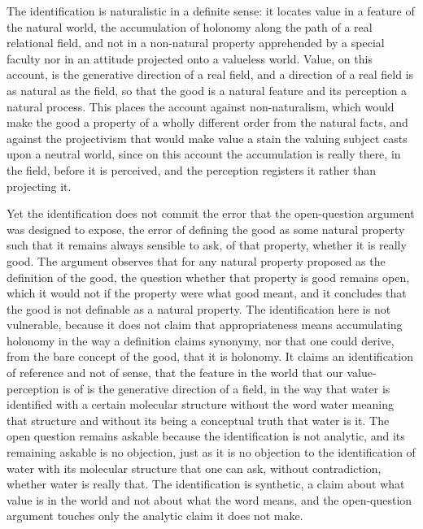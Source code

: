 The identification is naturalistic in a definite sense: it locates value in a feature of the natural world, the accumulation of holonomy along the path of a real relational field, and not in a non-natural property apprehended by a special faculty nor in an attitude projected onto a valueless world. Value, on this account, is the generative direction of a real field, and a direction of a real field is as natural as the field, so that the good is a natural feature and its perception a natural process. This places the account against non-naturalism, which would make the good a property of a wholly different order from the natural facts, and against the projectivism that would make value a stain the valuing subject casts upon a neutral world, since on this account the accumulation is really there, in the field, before it is perceived, and the perception registers it rather than projecting it.

Yet the identification does not commit the error that the open-question argument was designed to expose, the error of defining the good as some natural property such that it remains always sensible to ask, of that property, whether it is really good. The argument observes that for any natural property proposed as the definition of the good, the question whether that property is good remains open, which it would not if the property were what good meant, and it concludes that the good is not definable as a natural property. The identification here is not vulnerable, because it does not claim that appropriateness means accumulating holonomy in the way a definition claims synonymy, nor that one could derive, from the bare concept of the good, that it is holonomy. It claims an identification of reference and not of sense, that the feature in the world that our value-perception is of is the generative direction of a field, in the way that water is identified with a certain molecular structure without the word water meaning that structure and without its being a conceptual truth that water is it. The open question remains askable because the identification is not analytic, and its remaining askable is no objection, just as it is no objection to the identification of water with its molecular structure that one can ask, without contradiction, whether water is really that. The identification is synthetic, a claim about what value is in the world and not about what the word means, and the open-question argument touches only the analytic claim it does not make.

